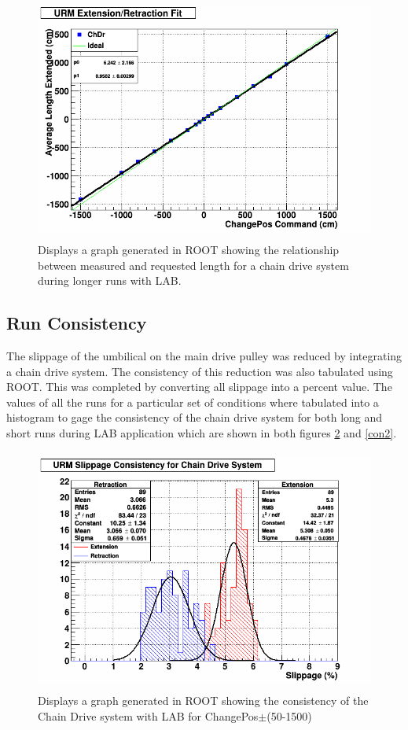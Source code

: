 \documentclass[paper=a4, fontsize=11pt]{scrartcl}
\numberwithin{equation}{section}		%
\numberwithin{figure}{section}			%
\numberwithin{table}{section}				%
\begin{document}
        \begin{figure}[H]
                \includegraphics[height=8cm]{big}
                \caption{Displays a graph generated in ROOT showing the relationship between measured and requested length for a chain drive system during longer runs with LAB.}
                \label{fit2}
        \end{figure}

\subsection{Run Consistency}
The slippage of the umbilical on the main drive pulley was reduced by integrating a chain drive system. The consistency of this reduction was also tabulated using ROOT. This was completed by converting all slippage into a percent value. The values of all the runs for a particular set of conditions where tabulated into a histogram to gage the consistency of the chain drive system for both long and short runs during LAB application which are shown in both figures \ref{con1} and \ref{con2}. 

    \begin{figure}[h]
                \includegraphics[height=8cm]{fdat1}
                \caption{Displays a graph generated in ROOT showing the consistency of the Chain Drive system with LAB for ChangePos$\pm$(50-1500) }
				\label{con1}
        \end{figure}
\end{document}
